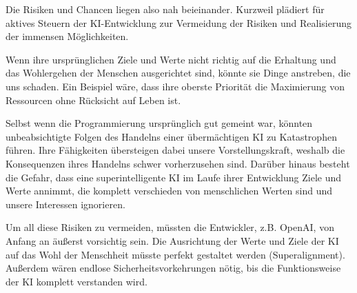 \documentclass[10pt]{article}
\begin{document}
Die Risiken und Chancen liegen also nah beieinander. Kurzweil plädiert für aktives Steuern der KI-Entwicklung zur Vermeidung der Risiken und Realisierung der immensen Möglichkeiten.

Wenn ihre ursprünglichen Ziele und Werte nicht richtig auf die Erhaltung und das Wohlergehen der Menschen ausgerichtet sind, könnte sie Dinge anstreben, die uns schaden. Ein Beispiel wäre, dass ihre oberste Priorität die Maximierung von Ressourcen ohne Rücksicht auf Leben ist.

Selbst wenn die Programmierung ursprünglich gut gemeint war, könnten unbeabsichtigte Folgen des Handelns einer übermächtigen KI zu Katastrophen führen. Ihre Fähigkeiten übersteigen dabei unsere Vorstellungskraft, weshalb die Konsequenzen ihres Handelns schwer vorherzusehen sind. Darüber hinaus besteht die Gefahr, dass eine superintelligente KI im Laufe ihrer Entwicklung Ziele und Werte annimmt, die komplett verschieden von menschlichen Werten sind und unsere Interessen ignorieren.

Um all diese Risiken zu vermeiden, müssten die Entwickler, z.B. OpenAI, von Anfang an äußerst vorsichtig sein. Die Ausrichtung der Werte und Ziele der KI auf das Wohl der Menschheit müsste perfekt gestaltet werden (Superalignment). Außerdem wären endlose Sicherheitsvorkehrungen nötig, bis die Funktionsweise der KI komplett verstanden wird.
\cite{KurzweilBuch}
\cite{Openai}



\end{document}
